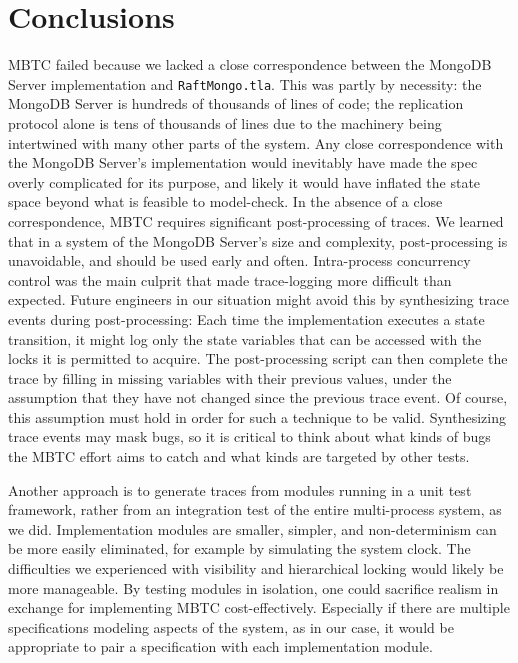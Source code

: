 \documentclass{vldb}
\begin{document}
\section{Conclusions}
\label{sec:conclusions}

MBTC failed because we lacked a close correspondence between the MongoDB Server implementation and \texttt{RaftMongo.tla}.
This was partly by necessity: the MongoDB Server is hundreds of thousands of lines of code; the replication protocol alone is tens of thousands of lines due to the machinery being intertwined with many other parts of the system.
Any close correspondence with the MongoDB Server's implementation would inevitably have made the spec overly complicated for its purpose, and likely it would have inflated the state space beyond what is feasible to model-check.
In the absence of a close correspondence, MBTC requires significant post-processing of traces. 
We learned that in a system of the MongoDB Server's size and complexity, post-processing is unavoidable, and should be used early and often.
Intra-process concurrency control was the main culprit that made trace-logging more difficult than expected.
Future engineers in our situation might avoid this by synthesizing trace events during post-processing: Each time the implementation executes a state transition, it might log only the state variables that can be accessed with the locks it is permitted to acquire.
The post-processing script can then complete the trace by filling in missing variables with their previous values, under the assumption that they have not changed since the previous trace event.
Of course, this assumption must hold in order for such a technique to be valid.
Synthesizing trace events may mask bugs, so it is critical to think about what kinds of bugs the MBTC effort aims to catch and what kinds are targeted by other tests.

\balance

Another approach is to generate traces from modules running in a unit test framework, rather from an integration test of the entire multi-process system, as we did.
Implementation modules are smaller, simpler, and non-determinism can be more easily eliminated, for example by simulating the system clock. 
The difficulties we experienced with visibility and hierarchical locking would likely be more manageable.
By testing modules in isolation, one could sacrifice realism in exchange for implementing MBTC cost-effectively.
Especially if there are multiple specifications modeling aspects of the system, as in our case, it would be appropriate to pair a specification with each implementation module.
\end{document}
